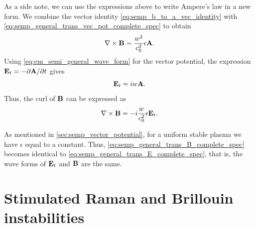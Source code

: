 \documentclass[a4paper,11pt]{report}
\begin{document}
As a side note, we can use the expressions above to write Ampere's law in a new form. We combine the vector identity \cref{eq:semp_b_to_a_vec_identity} with \cref{eq:semp_general_trans_vec_pot_complete_spec} to obtain
\begin{equation*}
    \nabla \times \mathbf{B} = \frac{w^2}{c_0^2} \epsilon \mathbf{A}.
\end{equation*}
Using \cref{eq:em_semi_general_wave_form} for the vector potential, the expression $\mathbf{E}_t = -\partial \mathbf{A} / \partial t$ gives
\begin{equation*}
    \mathbf{E}_t = iw \mathbf{A}.
\end{equation*}
Thus, the curl of $\mathbf{B}$ can be expressed as
\begin{equation}
    \nabla \times \mathbf{B} = -i \frac{w}{c_0^2} \epsilon \mathbf{E}_t.
\end{equation}

As mentioned in \cref{sec:semp_vector_potential}, for a uniform stable plasma we have $\epsilon$ equal to a constant. Thus, \cref{eq:semp_general_trans_B_complete_spec} becomes identical to \cref{eq:semp_general_trans_E_complete_spec}, that is, the wave forms of $\mathbf{E}_t$ and $\mathbf{B}$ are the same. 

\chapter{Stimulated Raman and Brillouin instabilities}
\end{document}
